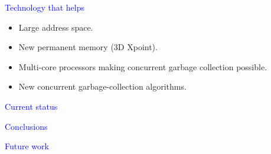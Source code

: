 \documentclass{slides}
\newcommand{\ti}[1]{\begin{center}\Large{\textcolor{blue}{#1}}\end{center}}
\begin{document}
\begin{slide}\ti{Technology that helps}

  \begin{itemize}
  \item Large address space.
  \item New permanent memory (3D Xpoint).
  \item Multi-core processors making concurrent garbage collection
    possible. 
  \item New concurrent garbage-collection algorithms.
  \end{itemize}

\vfill\end{slide}
\begin{slide}\ti{Current status}
\vfill\end{slide}
\begin{slide}\ti{Conclusions}

\vfill\end{slide}
\begin{slide}\ti{Future work}

\vfill\end{slide}



\end{document}
